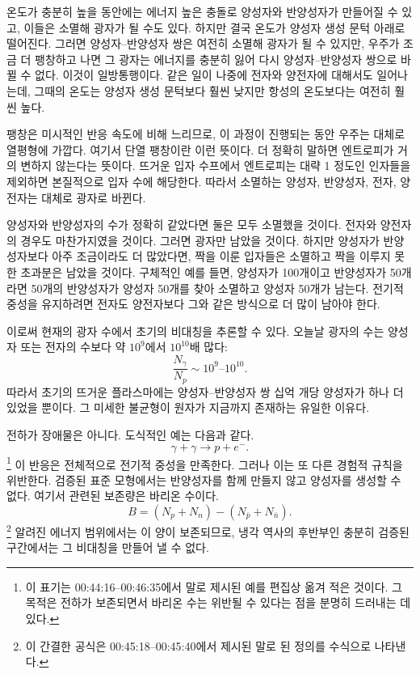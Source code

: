 온도가 충분히 높을 동안에는 에너지 높은 충돌로 양성자와 반양성자가 만들어질 수 있고, 이들은 소멸해 광자가 될 수도 있다. 하지만 결국 온도가 양성자 생성 문턱 아래로 떨어진다. 그러면 양성자--반양성자 쌍은 여전히 소멸해 광자가 될 수 있지만, 우주가 조금 더 팽창하고 나면 그 광자는 에너지를 충분히 잃어 다시 양성자--반양성자 쌍으로 바뀔 수 없다. 이것이 일방통행이다. 같은 일이 나중에 전자와 양전자에 대해서도 일어나는데, 그때의 온도는 양성자 생성 문턱보다 훨씬 낮지만 항성의 온도보다는 여전히 훨씬 높다.

팽창은 미시적인 반응 속도에 비해 느리므로, 이 과정이 진행되는 동안 우주는 대체로 열평형에 가깝다. 여기서 단열 팽창이란 이런 뜻이다. 더 정확히 말하면 엔트로피가 거의 변하지 않는다는 뜻이다. 뜨거운 입자 수프에서 엔트로피는 대략 1 정도인 인자들을 제외하면 본질적으로 입자 수에 해당한다. 따라서 소멸하는 양성자, 반양성자, 전자, 양전자는 대체로 광자로 바뀐다.

양성자와 반양성자의 수가 정확히 같았다면 둘은 모두 소멸했을 것이다. 전자와 양전자의 경우도 마찬가지였을 것이다. 그러면 광자만 남았을 것이다. 하지만 양성자가 반양성자보다 아주 조금이라도 더 많았다면, 짝을 이룬 입자들은 소멸하고 짝을 이루지 못한 초과분은 남았을 것이다. 구체적인 예를 들면, 양성자가 100개이고 반양성자가 50개라면 50개의 반양성자가 양성자 50개를 찾아 소멸하고 양성자 50개가 남는다. 전기적 중성을 유지하려면 전자도 양전자보다 그와 같은 방식으로 더 많이 남아야 한다.

이로써 현재의 광자 수에서 초기의 비대칭을 추론할 수 있다. 오늘날 광자의 수는 양성자 또는 전자의 수보다 약 \(10^9\)에서 \(10^{10}\)배 많다:
\[
\frac{N_\gamma}{N_p} \sim 10^9\text{--}10^{10}.
\]
따라서 초기의 뜨거운 플라스마에는 양성자--반양성자 쌍 십억 개당 양성자가 하나 더 있었을 뿐이다. 그 미세한 불균형이 원자가 지금까지 존재하는 유일한 이유다.

\begin{classroomqa}
\end{classroomqa}

전하가 장애물은 아니다. 도식적인 예는 다음과 같다.
\[
\gamma + \gamma \to p + e^-.
\]\footnote{이 표기는 00:44:16--00:46:35에서 말로 제시된 예를 편집상 옮겨 적은 것이다. 그 목적은 전하가 보존되면서 바리온 수는 위반될 수 있다는 점을 분명히 드러내는 데 있다.}
이 반응은 전체적으로 전기적 중성을 만족한다. 그러나 이는 또 다른 경험적 규칙을 위반한다. 검증된 표준 모형에서는 반양성자를 함께 만들지 않고 양성자를 생성할 수 없다. 여기서 관련된 보존량은 바리온 수이다.
\[
B=(N_p+N_n)-(N_{\bar p}+N_{\bar n}).
\]\footnote{이 간결한 공식은 00:45:18--00:45:40에서 제시된 말로 된 정의를 수식으로 나타낸다.}
알려진 에너지 범위에서는 이 양이 보존되므로, 냉각 역사의 후반부인 충분히 검증된 구간에서는 그 비대칭을 만들어 낼 수 없다.

